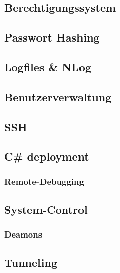 \documentclass[
  9pt,
  a4paperpaper,
  DIV=11]{scrartcl}
\numberwithin{equation}{section}
\begin{document}
\begin{multicols}{2}
\begin{tcolorbox}
\begin{tcolorbox}
\begin{tcolorbox}
\begin{tcolorbox}
\begin{tcolorbox}
\begin{tcolorbox}
\hypertarget{berechtigungssystem}{%
\subsection{Berechtigungssystem}\label{berechtigungssystem}}

\hypertarget{passwort-hashing}{%
\subsection{Passwort Hashing}\label{passwort-hashing}}

\hypertarget{logfiles-nlog}{%
\subsection{Logfiles \& NLog}\label{logfiles-nlog}}

\hypertarget{benutzerverwaltung}{%
\subsection{Benutzerverwaltung}\label{benutzerverwaltung}}

\hypertarget{ssh}{%
\subsection{SSH}\label{ssh}}

\hypertarget{c-deployment}{%
\subsection{C\# deployment}\label{c-deployment}}

\hypertarget{remote-debugging}{%
\subsubsection{Remote-Debugging}\label{remote-debugging}}

\hypertarget{system-control}{%
\subsection{System-Control}\label{system-control}}

\hypertarget{deamons}{%
\subsubsection{Deamons}\label{deamons}}

\hypertarget{tunneling}{%
\subsection{Tunneling}\label{tunneling}}


\end{tcolorbox}
\end{tcolorbox}
\end{tcolorbox}
\end{tcolorbox}
\end{tcolorbox}
\end{tcolorbox}
\end{multicols}
\end{document}
